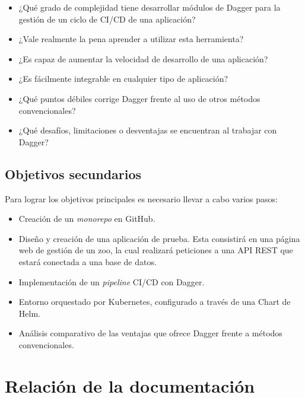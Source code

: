 \begin{itemize}
  \item ¿Qué grado de complejidad tiene desarrollar módulos de Dagger para la gestión de un ciclo de CI/CD de una aplicación?
  \item ¿Vale realmente la pena aprender a utilizar esta herramienta?
  \item ¿Es capaz de aumentar la velocidad de desarrollo de una aplicación?
  \item ¿Es fácilmente integrable en cualquier tipo de aplicación?
  \item ¿Qué puntos débiles corrige Dagger frente al uso de otros métodos convencionales?
  \item ¿Qué desafíos, limitaciones o desventajas se encuentran al trabajar con Dagger?
\end{itemize}

\subsection*{Objetivos secundarios}

Para lograr los objetivos principales es necesario llevar a cabo varios pasos:

\begin{itemize}
  \item Creación de un \textit{monorepo}\cite{monorepo} en GitHub.
  \item Diseño y creación de una aplicación de prueba. Esta consistirá en una página web de gestión de un zoo, la cual realizará peticiones a una API REST que estará conectada a una base de datos.
  \item Implementación de un \textit{pipeline} CI/CD con Dagger.
  \item Entorno orquestado por Kubernetes\cite{kubernetes}, configurado a través de una Chart de Helm\cite{helm}.
  \item Análisis comparativo de las ventajas que ofrece Dagger frente a métodos convencionales.
\end{itemize}

\section{Relación de la documentación}

